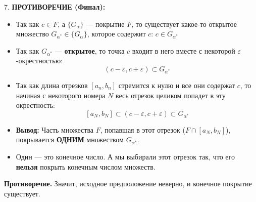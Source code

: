 \begin{tcolorbox}[title=Доказательство (Метод вложенных отрезков)]
    7. \textbf{ПРОТИВОРЕЧИЕ (Финал):}
    \begin{itemize}
        \item Так как $c \in F$, а $\{G_\alpha\}$ — покрытие $F$, то существует какое-то открытое множество $G_{\alpha^*} \in \{G_\alpha\}$, которое содержит $c$:
        $ c \in G_{\alpha^*} $
        \item Так как $G_{\alpha^*}$ — \textbf{открытое}, то точка $c$ входит в него вместе с некоторой $\varepsilon$-окрестностью:
        \[ (c - \varepsilon, c + \varepsilon) \subset G_{\alpha^*} \]
        \item Так как длина отрезков $[a_n, b_n]$ стремится к нулю и все они содержат $c$, то начиная с некоторого номера $N$ весь отрезок целиком попадет в эту окрестность:
        \[ [a_N, b_N] \subset (c - \varepsilon, c + \varepsilon) \subset G_{\alpha^*} \]
        \item \textbf{Вывод:} Часть множества $F$, попавшая в этот отрезок ($F \cap [a_N, b_N]$), покрывается \textbf{ОДНИМ} множеством $G_{\alpha^*}$.
        \item Один — это конечное число. А мы выбирали этот отрезок так, что его \textbf{нельзя} покрыть конечным числом множеств.
    \end{itemize}
    \textbf{Противоречие.} Значит, исходное предположение неверно, и конечное покрытие существует.
\end{tcolorbox}
